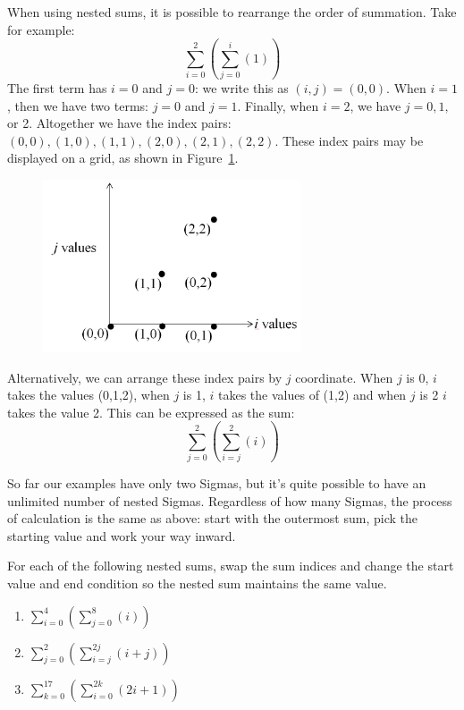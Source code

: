 When using nested sums, it is possible to rearrange the order of summation.  Take for example:
\[\sum_{i=0}^{2} \left( \sum_{j=0}^{i}(1) \right)\]
The first term has $i=0$ and $j=0$: we write this as $(i,j)=(0,0)$. When $i=1$, then we have two terms:  $j=0$ and $j=1$. Finally, when $i=2$, we have $j=0,1,$ or 2.  Altogether we have the index pairs: $(0,0), (1,0), (1,1), (2,0), (2,1), (2,2)$. These index pairs may be displayed on a grid, as shown in Figure~\ref{fig:1}.
\begin{figure}[htb]
\begin{center}
	\includegraphics[width=3.0in]{images/i02j0igraph.png}
\label{fig:1}
\end{center}
\end{figure} 

Alternatively, we can arrange these index pairs by $j$ coordinate.  When $j$ is 0, $i$ takes the values (0,1,2), when $j$ is 1, $i$ takes the values of (1,2) and when $j$ is 2 $i$ takes the value 2.  This can be expressed as the sum:
\[\sum_{j=0}^{2}(\sum_{i=j}^{2}(i))\]

So far our examples have only two Sigmas, but it's quite possible to have an unlimited number of nested Sigmas.  Regardless of how many Sigmas, the process of calculation is the same as above: start with the outermost sum, pick the starting value and work your way inward.

\begin {exercise}{}
For each of the following nested sums, swap the sum indices and change the start value and end condition so the nested sum maintains the same value.
\begin {enumerate}[(1)]
\item
$\sum_{i=0}^{4}(\sum_{j=0}^{8}(i))$
\item
$\sum_{j=0}^{2}(\sum_{i=j}^{2j}(i+j))$
\item
$\sum_{k=0}^{17}(\sum_{i=0}^{2k}(2i+1))$
\end {enumerate}
\end{exercise}

